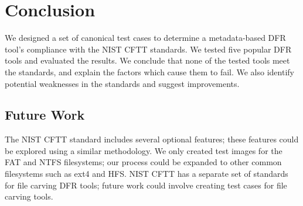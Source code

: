 \section{Conclusion}

We designed a set of canonical test cases to determine a metadata-based DFR tool's compliance with the NIST CFTT standards.
We tested five popular DFR tools and evaluated the results.
We conclude that none of the tested tools meet the standards, and explain the factors which cause them to fail.
We also identify potential weaknesses in the standards and suggest improvements.

\subsection{Future Work}
The NIST CFTT standard includes several optional features; these features could be explored using a similar methodology.
We only created test images for the FAT and NTFS filesystems; our process could be expanded to other common filesystems such as ext4 and HFS.
NIST CFTT has a separate set of standards for file carving DFR tools; future work could involve creating test cases for file carving tools.
